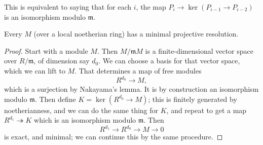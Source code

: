 This is equivalent to saying that for each $i$, the map $P_i \to \ker(P_{i-1}
\to P_{i-2})$ is an isomorphism modulo $\mathfrak{m}$.

\begin{proposition} 
Every $M$ (over a local noetherian ring) has a minimal projective resolution.
\end{proposition} 
\begin{proof} 
Start with a module $M$. Then $M/\mathfrak{m}M$ is a finite-dimensional vector
space over $R/\mathfrak{m}$, of dimension say $d_0$. We can choose a basis for that vector space, which
we can lift to $M$. That determines a map of free modules
\[ R^{d_0} \to M,  \]
which is a  surjection by Nakayama's lemma. It is by construction an
isomorphism modulo $\mathfrak{m}$. Then define $K = \ker(R^{d_0} \to M)$; this
is finitely generated by noetherianness, and we
can do the same thing for $K$, and repeat to get a map $R^{d_1}
\twoheadrightarrow K$ which is an isomorphism modulo $\mathfrak{m}$. Then 
\[ R^{d_1} \to R^{d_0} \to M \to 0  \]
is exact, and minimal; we can continue this by the same procedure.
\end{proof}


